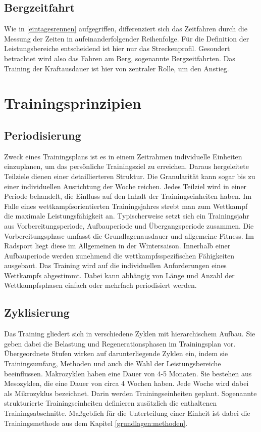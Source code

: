 \subsection{Bergzeitfahrt}
Wie in \ref{eintagesrennen} aufgegriffen, differenziert sich das Zeitfahren durch die Messung der Zeiten in aufeinanderfolgender Reihenfolge. Für die Definition der Leistungsbereiche entscheidend ist hier nur das Streckenprofil. Gesondert betrachtet wird also das Fahren am Berg, sogenannte Bergzeitfahrten. Das Training der Kraftausdauer ist hier von zentraler Rolle, um den Anstieg. 
\section{Trainingsprinzipien}
\subsection{Periodisierung}
Zweck eines Trainingsplans ist es in einem Zeitrahmen individuelle Einheiten einzuplanen, um das persönliche Trainingsziel zu erreichen. Daraus hergeleitete Teilziele dienen einer detaillierteren Struktur. Die Granularität kann sogar bis zu einer individuellen Ausrichtung der Woche reichen. Jedes Teilziel wird in einer Periode behandelt, die Einfluss auf den Inhalt der Trainingseinheiten haben.\cite{periodization} \newline
Im Falle eines wettkampfsorientierten Trainingsjahres strebt man zum Wettkampf die maximale Leistungsfähigkeit an. Typischerweise setzt sich ein Trainingsjahr aus Vorbereitungsperiode, Aufbauperiode und Übergangsperiode zusammen.\cite[279]{Trainingswissenschaft} Die Vorbereitungsphase umfasst die Grundlagenausdauer und allgemeine Fitness. Im Radsport liegt diese im Allgemeinen in der Wintersaison. Innerhalb einer Aufbauperiode werden zunehmend die wettkampfsspezifischen Fähigkeiten ausgebaut. Das Training wird auf die individuellen Anforderungen eines Wettkampfs abgestimmt. Dabei kann abhängig von Länge und Anzahl der Wettkampfsphasen einfach oder mehrfach periodisiert werden.
\subsection{Zyklisierung}
Das Training gliedert sich in verschiedene Zyklen mit hierarchischem Aufbau. Sie geben dabei die Belastung und Regenerationsphasen im Trainingsplan vor. Übergeordnete Stufen wirken auf darunterliegende Zyklen ein, indem sie Trainingsumfang, Methoden und auch die Wahl der Leistungsbereiche beeinflussen. \cite[283]{Trainingswissenschaft}
Makrozyklen haben eine Dauer von 4-5 Monaten. Sie bestehen aus Mesozyklen, die eine Dauer von circa 4 Wochen haben. Jede Woche wird dabei als Mikrozyklus bezeichnet. Darin werden Trainingseinheiten geplant. Sogenannte strukturierte Trainingseinheiten definieren zusätzlich die enthaltenen Trainingsabschnitte. Maßgeblich für die Unterteilung einer Einheit ist dabei die Trainingsmethode aus dem Kapitel \ref{grundlagen:methoden}.
